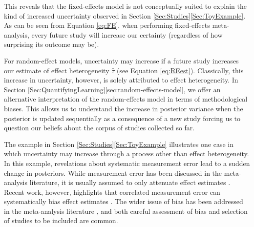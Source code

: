 This  reveals that the fixed-effects model is
not conceptually suited to explain the kind of increased uncertainty observed in Section \ref{Sec:Studies}\ref{Sec:ToyExample}. As can be seen from Equation \ref{eq:FE}, when performing fixed-effects meta-analysis, every future study will increase our certainty (regardless of how surprising its outcome may be). 

For random-effect models, uncertainty may increase if a future study increases our estimate of effect heterogeneity $\hat \tau$  (see Equation \ref{eq:REest}). Classically, this increase in uncertainty, however, is solely attributed to effect heterogeneity. In Section \ref{Sec:QuantifyingLearning}\ref{sec:random-effects-model}, we offer an alternative interpretation of the random-effects model in terms of methodological biases. This allows us to understand the increase in posterior variance when the posterior is updated sequentially as a consequence of a new study forcing us to question our beliefs about the corpus of studies collected so far.  

The example in Section \ref{Sec:Studies}\ref{Sec:ToyExample} illustrates one case in which uncertainty may increase through a process other than effect heterogeneity.  In this example, revelations about systematic measurement error lead to a sudden change in posteriors.
While measurement error has been discussed in the meta-analysis literature, 
it is usually assumed to only attenuate effect estimates \citep{Cooper_2009}. Recent work, however, highlights that correlated measurement error can systematically bias effect estimates \citep{Knox_Lucas_Cho_2022,Mikhaeil_2025}. The wider issue of bias has been addressed in the meta-analysis literature \citep{Higgins_Thompson_Spiegelhalter_2009,Carter_2019,Wiernik_Dahlke_2020}, and both careful assessment of bias and selection of studies to be included are common. 


